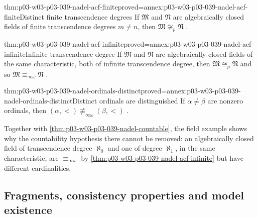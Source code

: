 \begin{hbtheorem}{thm:p03-w03-p03-039-nadel-acf-finite}{proved=annex:p03-w03-p03-039-nadel-acf-finite}{Distinct finite transcendence degrees}
If \(\mathfrak M\) and \(\mathfrak N\) are algebraically closed fields of
finite transcendence degrees \(m\ne n\), then
\(\mathfrak M\not\cong_p\mathfrak N\)
\cite[p.~277]{Nadel1985Admissible}.
\end{hbtheorem}

\begin{hbtheorem}{thm:p03-w03-p03-039-nadel-acf-infinite}{proved=annex:p03-w03-p03-039-nadel-acf-infinite}{Infinite transcendence degree}
If \(\mathfrak M\) and \(\mathfrak N\) are algebraically closed fields of the
same characteristic, both of infinite transcendence degree, then
\(\mathfrak M\cong_p\mathfrak N\) and so
\(\mathfrak M\equiv_{\infty\omega}\mathfrak N\)
\cite[p.~278]{Nadel1985Admissible}.
\end{hbtheorem}

\begin{hbcorollary}{thm:p03-w03-p03-039-nadel-ordinals-distinct}{proved=annex:p03-w03-p03-039-nadel-ordinals-distinct}{Distinct ordinals are distinguished}
If \(\alpha\ne\beta\) are nonzero ordinals, then
\((\alpha,<)\not\equiv_{\infty\omega}(\beta,<)\)
\cite[p.~278]{Nadel1985Admissible}.
\end{hbcorollary}

Together with \cref{thm:p03-w03-p03-039-nadel-countable}, the field example
shows why the countability hypothesis there cannot be removed: an
algebraically closed field of transcendence degree \(\aleph_0\) and one of
degree \(\aleph_1\), in the same characteristic, are
\(\equiv_{\infty\omega}\) by
\cref{thm:p03-w03-p03-039-nadel-acf-infinite} but have different
cardinalities.

\subsection{Fragments, consistency properties and model existence}
\label{sec:p03-w03-p03-039-nadel-model-existence}

